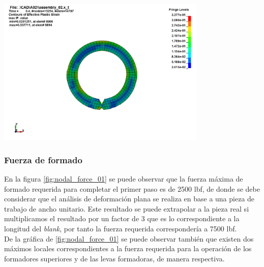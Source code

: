 \begin{center}
\includegraphics[width=0.75\textwidth]{src/ch4/efective_plastic_strain_02.png}
\label{fig:efective_plastic_strain_02}
\end{center}




\subsubsection{Fuerza de formado}

En la figura \ref{fig:nodal_force_01} se puede observar que la fuerza máxima de formado 
requerida para completar el primer paso es de 2500 lbf, de donde se debe considerar 
que el análisis de deformación plana se realiza en base a una pieza de trabajo de 
ancho unitario. Este resultado se puede extrapolar a la pieza real si multiplicamos el 
resultado por un factor de 3 que es lo correspondiente a la longitud del \textit{blank}, 
por tanto la fuerza requerida correspondería a 7500 lbf.\\

De la gráfica de \ref{fig:nodal_force_01} se puede observar también que existen dos máximos 
locales correspondientes a la fuerza requerida para la operación de los formadores superiores y 
de las levas formadoras, de manera respectiva.\\


